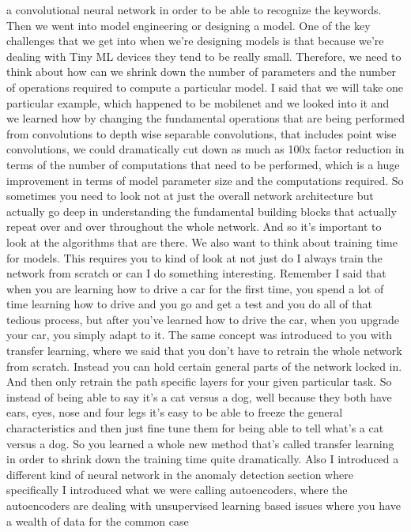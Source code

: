 a convolutional neural network in order to be able to recognize the keywords.
Then we went into model engineering or designing a model.
One of the key challenges that we get into when we're designing models
is that because we're dealing with Tiny ML devices
they tend to be really small.
Therefore, we need to think about how can we shrink down
the number of parameters and the number of operations
required to compute a particular model.
I said that we will take one particular example, which
happened to be mobilenet and we looked into it
and we learned how by changing the fundamental operations that
are being performed from convolutions to depth
wise separable convolutions, that includes point wise convolutions,
we could dramatically cut down as much as 100x factor reduction in terms
of the number of computations that need to be performed,
which is a huge improvement in terms of model parameter size
and the computations required.
So sometimes you need to look not at just the overall network architecture
but actually go deep in understanding the fundamental building
blocks that actually repeat over and over throughout the whole network.
And so it's important to look at the algorithms that are there.
We also want to think about training time for models.
This requires you to kind of look at not just
do I always train the network from scratch or can
I do something interesting.
Remember I said that when you are learning
how to drive a car for the first time, you spend a lot of time
learning how to drive and you go and get a test
and you do all of that tedious process, but after you've
learned how to drive the car, when you upgrade your car,
you simply adapt to it.
The same concept was introduced to you with transfer learning,
where we said that you don't have to retrain the whole network from scratch.
Instead you can hold certain general parts of the network locked in.
And then only retrain the path specific layers for your given particular task.
So instead of being able to say it's a cat versus a dog,
well because they both have ears, eyes, nose and four legs
it's easy to be able to freeze the general characteristics
and then just fine tune them for being able to tell what's a cat versus a dog.
So you learned a whole new method that's called transfer
learning in order to shrink down the training time quite dramatically.
Also I introduced a different kind of neural network
in the anomaly detection section where specifically I
introduced what we were calling autoencoders,
where the autoencoders are dealing with unsupervised learning based issues
where you have a wealth of data for the common case

